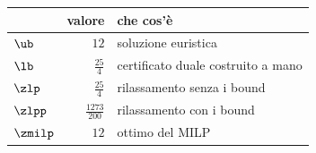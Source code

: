 \begin{center}\small
\begin{tabular}{lrl}
\toprule
 & valore & che cos'è \\
\midrule
$\ub$ & $12$ & soluzione euristica \\
$\lb$ & $\frac{25}{4}$ & certificato duale costruito a mano \\
$\zlp$ & $\frac{25}{4}$ & rilassamento senza i bound \\
$\zlpp$ & $\frac{1273}{200}$ & rilassamento con i bound \\
$\zmilp$ & $12$ & ottimo del MILP \\
\bottomrule
\end{tabular}
\end{center}
